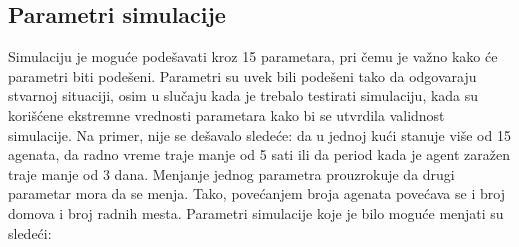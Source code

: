 \subsection{Parametri simulacije}

Simulaciju je moguće podešavati kroz 15 parametara, pri čemu je važno kako će parametri biti podešeni. Parametri su uvek bili podešeni tako da odgovaraju stvarnoj situaciji, osim u slučaju kada je trebalo testirati simulaciju, kada su korišćene ekstremne vrednosti parametara kako bi se utvrdila validnost simulacije. Na primer, nije se dešavalo sledeće: da u jednoj kući stanuje više od 15 agenata, da radno vreme traje manje od 5 sati ili da period kada je agent zaražen traje manje od 3 dana. Menjanje jednog parametra prouzrokuje da drugi parametar mora da se menja. Tako, povećanjem broja agenata povećava se i broj domova i broj radnih mesta. Parametri simulacije koje je bilo moguće menjati su sledeći:


